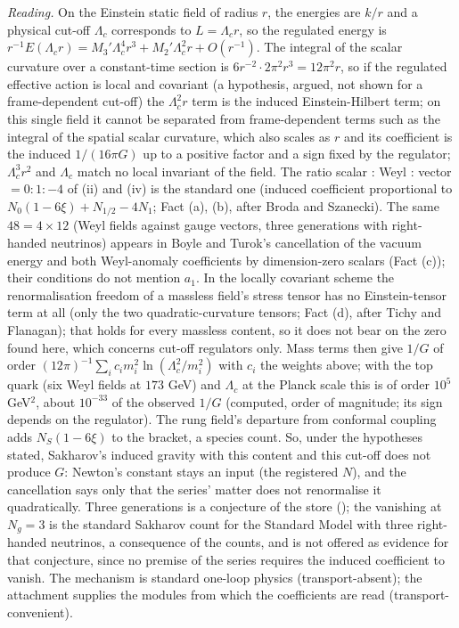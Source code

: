 \emph{Reading.} On the Einstein static field of radius $r$, the energies are $k/r$ and a physical cut-off $\Lambda_{c}$ corresponds to $L = \Lambda_{c}r$, so the regulated energy is $r^{-1}E(\Lambda_{c}r) = M_{3}'\Lambda_{c}^{4}r^{3} + M_{2}'\Lambda_{c}^{2}r + O(r^{-1})$. The integral of the scalar curvature over a constant-time section is $6r^{-2}\cdot 2\pi^{2}r^{3} = 12\pi^{2}r$, so if the regulated effective action is local and covariant (a hypothesis, argued, not shown for a frame-dependent cut-off) the $\Lambda_{c}^{2}r$ term is the induced Einstein-Hilbert term; on this single field it cannot be separated from frame-dependent terms such as the integral of the spatial scalar curvature, which also scales as $r$ and its coefficient is the induced $1/(16\pi G)$ up to a positive factor and a sign fixed by the regulator; $\Lambda_{c}^{3}r^{2}$ and $\Lambda_{c}$ match no local invariant of the field. The ratio scalar : Weyl : vector $= 0 : 1 : -4$ of (ii) and (iv) is the standard one (induced coefficient proportional to $N_{0}(1 - 6\xi) + N_{1/2} - 4N_{1}$; Fact (a), (b), after Broda and Szanecki). The same $48 = 4 \times 12$ (Weyl fields against gauge vectors, three generations with right-handed neutrinos) appears in Boyle and Turok's cancellation of the vacuum energy and both Weyl-anomaly coefficients by dimension-zero scalars (Fact (c)); their conditions do not mention $a_{1}$. In the locally covariant scheme the renormalisation freedom of a massless field's stress tensor has no Einstein-tensor term at all (only the two quadratic-curvature tensors; Fact (d), after Tichy and Flanagan); that holds for every massless content, so it does not bear on the zero found here, which concerns cut-off regulators only. Mass terms then give $1/G$ of order $(12\pi)^{-1}\sum_{i}c_{i}m_{i}^{2}\ln(\Lambda_{c}^{2}/m_{i}^{2})$ with $c_{i}$ the weights above; with the top quark (six Weyl fields at $173$ GeV) and $\Lambda_{c}$ at the Planck scale this is of order $10^{5}$ GeV$^{2}$, about $10^{-33}$ of the observed $1/G$ (computed, order of magnitude; its sign depends on the regulator). The rung field's departure from conformal coupling adds $N_{S}(1 - 6\xi)$ to the bracket, a species count. So, under the hypotheses stated, Sakharov's induced gravity with this content and this cut-off does not produce $G$: Newton's constant stays an input (the registered $N$), and the cancellation says only that the series' matter does not renormalise it quadratically. Three generations is a conjecture of the store (); the vanishing at $N_{g} = 3$ is the standard Sakharov count for the Standard Model with three right-handed neutrinos, a consequence of the counts, and is not offered as evidence for that conjecture, since no premise of the series requires the induced coefficient to vanish. The mechanism is standard one-loop physics (transport-absent); the attachment supplies the modules from which the coefficients are read (transport-convenient).
